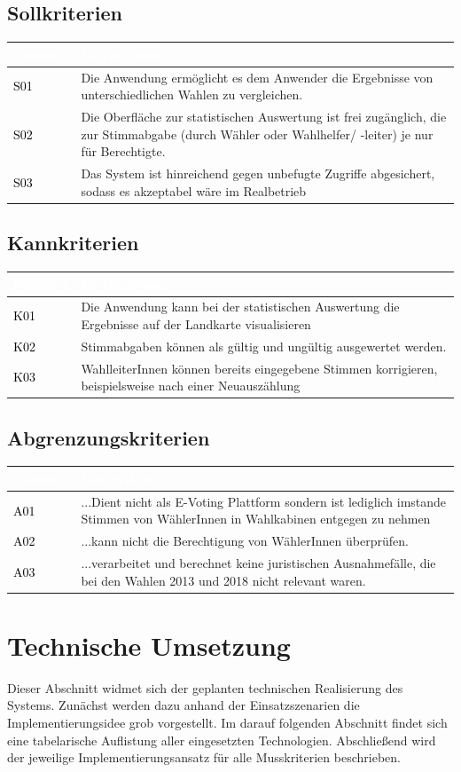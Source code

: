 \documentclass[a4paper,12pt]{article}
\newcommand\addrow[2]{\textcolor{black}{#1} &#2\\ \hline}
\newcommand\addheading[2]{\rowcolor{TUMBlue}\textcolor{white}{#1} & \textcolor{white}{#2}\\ \hline}
\newcommand\tabularhead{\begin{tabular}{|b|p{13cm}|}
\hline
}
\newenvironment{usecase}{\tabularhead}
{\hline\end{tabular}}
\begin{document}
\subsection{Sollkriterien}
\begin{usecase}
	\addheading{Nummer}{Beschreibung} 
	\addrow{S01}{Die Anwendung ermöglicht es dem Anwender die Ergebnisse von unterschiedlichen Wahlen zu vergleichen.}
      \addrow{S02}{Die Oberfläche zur statistischen Auswertung ist frei zugänglich, die zur Stimmabgabe (durch Wähler oder Wahlhelfer/ -leiter) je nur für Berechtigte.}
      \addrow{S03}{Das System ist hinreichend gegen unbefugte Zugriffe abgesichert, sodass es akzeptabel wäre im Realbetrieb}
\end{usecase}
\subsection{Kannkriterien}
\begin{usecase}
	\addheading{Nummer}{Beschreibung} 
	\addrow{K01}{Die Anwendung kann bei der statistischen Auswertung die Ergebnisse auf der Landkarte visualisieren}
      \addrow{K02}{Stimmabgaben können als gültig und ungültig ausgewertet werden.}
	\addrow{K03}{WahlleiterInnen können bereits eingegebene Stimmen korrigieren, beispielsweise nach einer Neuauszählung}
\end{usecase}

\subsection{Abgrenzungskriterien}
\begin{usecase}
      \addheading{Nummer}{Das System...} 
      \addrow{A01}{...Dient nicht als E-Voting Plattform sondern ist lediglich imstande Stimmen von WählerInnen in Wahlkabinen entgegen zu nehmen}
	\addrow{A02}{...kann nicht die Berechtigung von WählerInnen überprüfen.}
	\addrow{A03}{...verarbeitet und berechnet keine juristischen Ausnahmefälle, die bei den Wahlen 2013 und 2018 nicht relevant waren.}
\end{usecase}

\section{Technische Umsetzung}
Dieser Abschnitt widmet sich der geplanten technischen Realisierung
des Systems. Zunächst werden dazu anhand der Einsatzszenarien die Implementierungsidee
grob vorgestellt. Im darauf folgenden Abschnitt findet sich eine tabelarische 
Auflistung aller eingesetzten Technologien. Abschließend
wird der jeweilige Implementierungsansatz für alle Musskriterien beschrieben.
\end{document}
